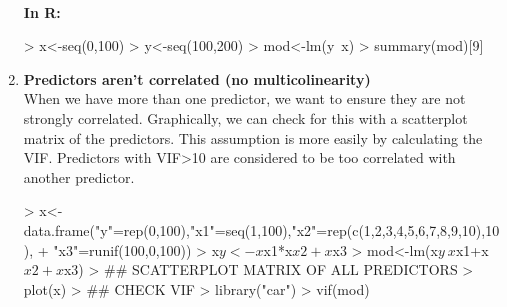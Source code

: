 \documentclass{article}
\begin{document}
\begin{enumerate}
    \\ \textbf{In R:}
\begin{Schunk}
\begin{Sinput}
> x<-seq(0,100)
> y<-seq(100,200)
> mod<-lm(y~x)
> summary(mod)[9]
\end{Sinput}
\end{Schunk}
    \item \textbf{Predictors aren't correlated (no multicolinearity)}
    \\ When we have more than one predictor, we want to ensure they are not strongly correlated. Graphically, we can check for this with a scatterplot matrix of the predictors. This assumption is more easily by calculating the VIF. Predictors with VIF>10 are considered to be too correlated with another predictor.
\begin{Schunk}
\begin{Sinput}
> x<- data.frame("y"=rep(0,100),"x1"=seq(1,100),"x2"=rep(c(1,2,3,4,5,6,7,8,9,10),10), 
+                "x3"=runif(100,0,100))
> x$y<-x$x1*x$x2+x$x3
> mod<-lm(x$y~x$x1+x$x2+x$x3)
> ## SCATTERPLOT MATRIX OF ALL PREDICTORS
> plot(x)
> ## CHECK VIF
> library("car")
> vif(mod)
\end{Sinput}
\end{Schunk}
  \end{enumerate}
\end{document}
